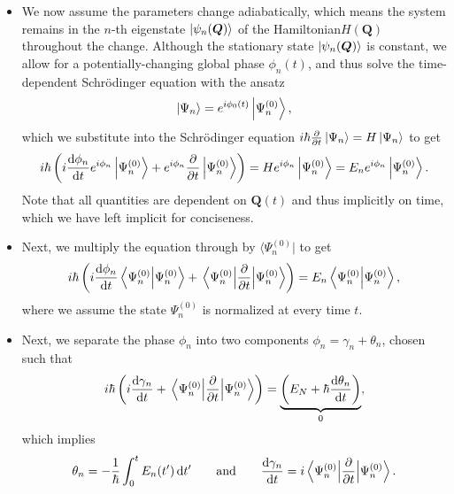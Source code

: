 \documentclass[11pt, a4paper]{article}
\newcommand{\diff}{\mathop{}\!\mathrm{d}} %
\newcommand{\Schro}{Schr\"{o}dinger\xspace}
\newcommand{\Ham}{Hamiltonian\xspace}
\renewcommand{\vec}[1]{\bm{#1}}  %
\newcommand{\Q}{\vec{Q}}  %
\renewcommand{\P}{\Psi}  %
\newcommand{\bbra}[1]{ \big \langle {#1} \big |  }
\begin{document}
\begin{itemize}
    \item We now assume the parameters change adiabatically, which means the system remains in the $ n $-th eigenstate $ \ket{\psi_{n}(\Q)} $ of the \Ham $ H(\Q) $ throughout the change. Although the stationary state $ \ket{\psi_{n}(\Q)} $ is constant, we allow for a potentially-changing global phase $ \phi_{n}(t) $, and thus solve the time-dependent \Schro equation with the ansatz
    \begin{equation*}
        \ket{\P_{n}} = e^{i\phi_{0}(t)} \ket{\Psi_{n}^{(0)}},
    \end{equation*}
    which we substitute into the \Schro equation $ i \hbar \pdv{t} \ket{\P_{n}} = H \ket{\Psi_{n}} $ to get
    \begin{equation*}
        i \hbar \left( i \dv{\phi_{n}}{t} e^{i\phi_{n}}\ket{\Psi_{n}^{(0)}} + e^{i\phi_{n}}\pdv{t}\ket{\Psi_{n}^{(0)}}\right) = H e^{i\phi_{n}}\ket{\Psi_{n}^{(0)}} = E_{n}e^{i\phi_{n}} \ket{\Psi_{n}^{(0)}}.
    \end{equation*}
    Note that all quantities are dependent on $ \Q(t) $ and thus implicitly on time, which we have left implicit for conciseness.

    \item Next, we multiply the equation through by $ \bbra{\Psi_{n}^{(0)}} $ to get
    \begin{equation*}
        i \hbar \left( i \dv{\phi_{n}}{t}\braket{\Psi_{n}^{(0)}}{\Psi_{n}^{(0)}} + \mel{\Psi_{n}^{(0)}}{\pdv{t}}{\Psi_{n}^{(0)}} \right) = E_{n} \braket{\Psi_{n}^{(0)}}{\Psi_{n}^{(0)}},
    \end{equation*}
    where we assume the state $ \Psi_{n}^{(0)} $ is normalized at every time $ t $.

    \item Next, we separate the phase $ \phi_{n} $ into two components $ \phi_{n} = \gamma_{n} + \theta_{n} $, chosen such that
    \begin{equation*}
        i \hbar \left( i \dv{\gamma_{n}}{t} + \mel{\Psi_{n}^{(0)}}{\pdv{t}}{\Psi_{n}^{(0)}} \right) = \underbrace{\left( E_{N} + \hbar \dv{\theta_{n}}{t} \right)}_{0},
    \end{equation*}
    which implies
    \begin{equation*}
        \theta_{n} = -\frac{1}{\hbar} \int_{0}^{t}E_{n}(t')\diff t' \qquad \text{and} \qquad \dv{\gamma_{n}}{t} = i \mel{\Psi_{n}^{(0)}}{\pdv{t}}{\Psi_{n}^{(0)}}.
    \end{equation*}


\end{itemize}
\end{document}
